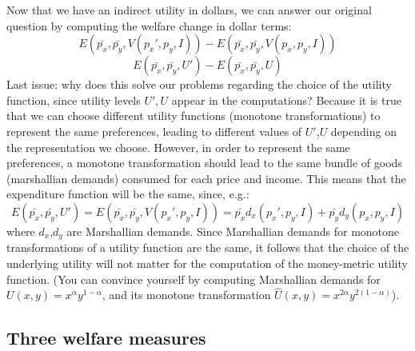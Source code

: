 \documentclass[11pt,english]{article}
\begin{document}
Now that we have an indirect utility in dollars, we can answer our
original question by computing the welfare change in dollar terms:
\[
E\left(\bar{p_{x}},\bar{p_{y}},V(p_{x}',p_{y},I)\right)-E\left(\bar{p_{x}},\bar{p_{y}},V(p_{x},p_{y},I)\right)
\]
\[
E\left(\bar{p_{x}},\bar{p_{y}},U'\right)-E\left(\bar{p_{x}},\bar{p_{y}},U\right)
\]
Last issue: why does this solve our problems regarding the choice
of the utility function, since utility levels $U',U$ appear in the
computations? Because it is true that we can choose different utility
functions (monotone transformations) to represent the same preferences,
leading to different values of $U'$,$U$ depending on the representation
we choose. However, in order to represent the same preferences, a monotone
transformation should lead to the same bundle of goods (marshallian
demands) consumed for each price and income. This means that the expenditure
function will be the same, since, e.g.:
\[
E\left(\bar{p_{x}},\bar{p_{y}},U'\right)=E\left(\bar{p_{x}},\bar{p_{y}},V(p_{x}',p_{y},I)\right)=\bar{p_{x}}d_{x}(p_{x}',p_{y},I)+\bar{p_{y}}d_{y}(p_{x},p_{y},I)
\]
where $d_{x}$,$d_{y}$ are Marshallian demands. Since Marshallian
demands for monotone transformations of a utility function are the
same, it follows that the choice of the underlying utility will not
matter for the computation of the money-metric utility function. (You
can convince yourself by computing Marshallian demands for $U(x,y)=x^{\alpha}y^{1-\alpha}$,
and its monotone transformation $\hat{U}(x,y)=x^{2\alpha}y^{2(1-\alpha)}$).

\subsection{Three welfare measures}
\end{document}
